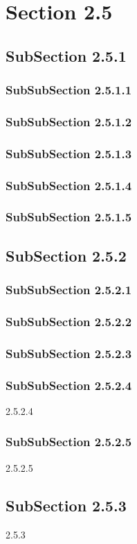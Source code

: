 \section{Section 2.5}
\subsection{SubSection 2.5.1}
\subsubsection{SubSubSection 2.5.1.1}
\subsubsection{SubSubSection 2.5.1.2}
\subsubsection{SubSubSection 2.5.1.3}
\subsubsection{SubSubSection 2.5.1.4}
\subsubsection{SubSubSection 2.5.1.5}
\subsection{SubSection 2.5.2}
\subsubsection{SubSubSection 2.5.2.1}
\subsubsection{SubSubSection 2.5.2.2}
\subsubsection{SubSubSection 2.5.2.3}
\subsubsection{SubSubSection 2.5.2.4}
2.5.2.4
\subsubsection{SubSubSection 2.5.2.5}
2.5.2.5
\subsection{SubSection 2.5.3}
2.5.3
